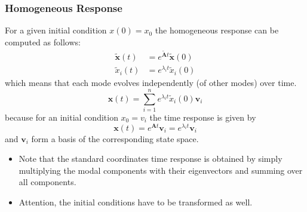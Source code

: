 \subsubsection{Homogeneous Response}
For a given initial condition $x(0)=x_0$ the homogeneous response can be computed as follows:\\
\begin{align*}
    \tilde{\mathbf{x}}(t) & =e^{\tilde{\mathbf{A}}t}\tilde{\mathbf{x}}(0) \\
    \tilde{x}_i(t)        & =e^{\lambda_{i}t}\tilde{x}_i(0)
\end{align*}
which means that each mode evolves independently (of other modes) over time.\\
\begin{equation*}
    \mathbf{x}(t)=\sum_{i=1}^{n}e^{\lambda_{i}t}\tilde{x}_i(0)\mathbf{v}_i
\end{equation*}
because for an initial condition $x_0 = v_i$ the time response is given by
\begin{equation*}
    \mathbf{x}(t)=e^{\mathbf{A}t}\mathbf{v}_i=e^{\lambda_{i}t}\mathbf{v}_i
\end{equation*}
and $\mathbf{v}_i$ form a basis of the corresponding state space.

\newpar{}
\begin{itemize}
    \item Note that the standard coordinates time response is obtained by simply multiplying the modal components with their eigenvectors and summing over all components.
    \item Attention, the initial conditions have to be transformed as well.
\end{itemize}

